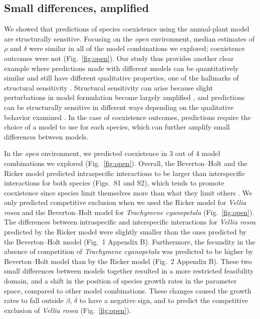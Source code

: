 \begin{refsection}

\subsection*{Small differences, amplified}

We showed that predictions of species coexistence using the annual-plant model are structurally sensitive. Focusing on the \textit{open} environment, median estimates of $\rho$ and $\delta$  were similar in all of the model combinations we explored; coexistence outcomes were not (Fig.~\ref{fig:open}). Our study thus provides another clear example where predictions made with different models can be quantitatively similar and still have different qualitative properties, one of the hallmarks of structural sensitivity \citep{flora_structural_2011}.  Structural sensitivity can arise because slight perturbations in model formulation become largely amplified \citep{flora_structural_2011, wood1999super}, and predictions can be structurally sensitive in different ways depending on the qualitative behavior examined \citep{flora_structural_2011, aldebert2018community}. In the case of coexistence outcomes, predictions require the choice of a model to use for each species, which can further amplify small differences between models.

In the \textit{open} environment, we predicted coexistence in 3 out of 4 model combinations we explored (Fig.~\ref{fig:open}). Overall, the Beverton--Holt and the Ricker model predicted intraspecific interactions to be larger than interspecific interactions for both species (Figs.~S1 and S2), which tends to promote coexistence since species limit themselves more than what they limit others \citep{chesson_general_2000}. We only predicted competitive exclusion when we used the Ricker model for \textit{Vellia rosea} and the Beverton--Holt model for \textit{Trachymene cyanopetala} (Fig.~\ref{fig:open}). The differences between intraspecific and interspecific interactions for \textit{Vellia rosea} predicted by the Ricker model were slightly smaller than the ones predicted by the Beverton--Holt model (Fig.~1 Appendix B). Furthermore, the fecundity in the absence of competition of \textit{Trachymene cyanopetala} was predicted to be higher by Beverton--Holt model than by the Ricker model (Fig.~2 Appendix B). These two small differences between models together resulted in a more restricted feasibility domain, and a shift in the position of species growth rates in the parameter space, compared to other model combinations. These changes caused the growth rates to fall outside $\beta$, $\delta$ to have a negative sign, and to predict the competitive exclusion of \textit{Vellia rosea} (Fig.~\ref{fig:open}).


\end{refsection}
